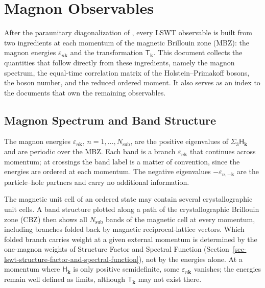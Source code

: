 
\hypertarget{sec-lswt-magnon-observables}{%
\section{Magnon Observables}\label{sec-lswt-magnon-observables}}

After the paraunitary diagonalization of , every LSWT observable is built from two ingredients at each momentum of the magnetic Brillouin zone (MBZ): the magnon energies \(\varepsilon_{n\mathbf k}\) and the transformation \(\mathsf T_{\mathbf k}\). This document collects the quantities that follow directly from these ingredients, namely the magnon spectrum, the equal-time correlation matrix of the Holstein--Primakoff bosons, the boson number, and the reduced ordered moment. It also serves as an index to the documents that own the remaining observables.

\subsection{Magnon Spectrum and Band Structure}

The magnon energies \(\varepsilon_{n\mathbf k}\), \(n=1,\ldots,N_{\mathrm{sub}}\), are the positive eigenvalues of \(\Sigma_3\mathsf H_{\mathbf k}\) and are periodic over the MBZ. Each band is a branch \(\varepsilon_{n\mathbf k}\) that continues across momentum; at crossings the band label is a matter of convention, since the energies are ordered at each momentum. The negative eigenvalues \(-\varepsilon_{n,-\mathbf k}\) are the particle--hole partners and carry no additional information.

The magnetic unit cell of an ordered state may contain several crystallographic unit cells. A band structure plotted along a path of the crystallographic Brillouin zone (CBZ) then shows all \(N_{\mathrm{sub}}\) bands of the magnetic cell at every momentum, including branches folded back by magnetic reciprocal-lattice vectors. Which folded branch carries weight at a given external momentum is determined by the one-magnon weights of Structure Factor and Spectral Function (Section~\ref{sec-lswt-structure-factor-and-spectral-function}), not by the energies alone. At a momentum where \(\mathsf H_{\mathbf k}\) is only positive semidefinite, some \(\varepsilon_{n\mathbf k}\) vanishes; the energies remain well defined as limits, although \(\mathsf T_{\mathbf k}\) may not exist there.

